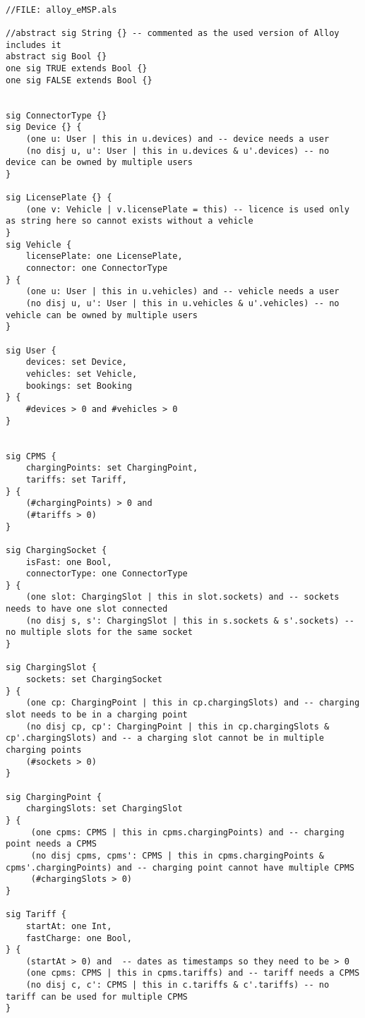 \begin{lstlisting}

//FILE: alloy_eMSP.als

//abstract sig String {} -- commented as the used version of Alloy includes it
abstract sig Bool {}
one sig TRUE extends Bool {}
one sig FALSE extends Bool {}


sig ConnectorType {}
sig Device {} {
	(one u: User | this in u.devices) and -- device needs a user
	(no disj u, u': User | this in u.devices & u'.devices) -- no device can be owned by multiple users
}

sig LicensePlate {} {
	(one v: Vehicle | v.licensePlate = this) -- licence is used only as string here so cannot exists without a vehicle
}
sig Vehicle {
	licensePlate: one LicensePlate,
	connector: one ConnectorType
} {
	(one u: User | this in u.vehicles) and -- vehicle needs a user
	(no disj u, u': User | this in u.vehicles & u'.vehicles) -- no vehicle can be owned by multiple users
}

sig User {
	devices: set Device,
	vehicles: set Vehicle,
	bookings: set Booking
} {
	#devices > 0 and #vehicles > 0
}


sig CPMS {
	chargingPoints: set ChargingPoint,
	tariffs: set Tariff,
} {
 	(#chargingPoints) > 0 and
	(#tariffs > 0)
}

sig ChargingSocket {
	isFast: one Bool,
	connectorType: one ConnectorType
} {
	(one slot: ChargingSlot | this in slot.sockets) and -- sockets needs to have one slot connected
	(no disj s, s': ChargingSlot | this in s.sockets & s'.sockets) -- no multiple slots for the same socket
}

sig ChargingSlot {
	sockets: set ChargingSocket
} {
	(one cp: ChargingPoint | this in cp.chargingSlots) and -- charging slot needs to be in a charging point
	(no disj cp, cp': ChargingPoint | this in cp.chargingSlots & cp'.chargingSlots) and -- a charging slot cannot be in multiple charging points
	(#sockets > 0)
}

sig ChargingPoint {
	chargingSlots: set ChargingSlot
} {
	 (one cpms: CPMS | this in cpms.chargingPoints) and -- charging point needs a CPMS
	 (no disj cpms, cpms': CPMS | this in cpms.chargingPoints & cpms'.chargingPoints) and -- charging point cannot have multiple CPMS
	 (#chargingSlots > 0)
}

sig Tariff {
	startAt: one Int,
	fastCharge: one Bool,
} {
 	(startAt > 0) and  -- dates as timestamps so they need to be > 0
	(one cpms: CPMS | this in cpms.tariffs) and -- tariff needs a CPMS
	(no disj c, c': CPMS | this in c.tariffs & c'.tariffs) -- no tariff can be used for multiple CPMS
}


\end{lstlisting}
